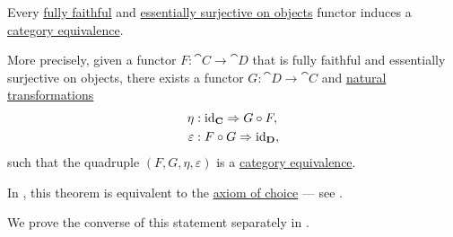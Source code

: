 \begin{theorem}\label{thm:fully_faithful_and_essentially_surjective_functor_induces_equivalence}
  Every \hyperref[def:functor_invertibility/fully_faithful]{fully faithful} and \hyperref[def:functor_invertibility/surjective_on_objects]{essentially surjective on objects} functor induces a \hyperref[def:category_equivalence]{category equivalence}.

  More precisely, given a functor \( F: \cat{C} \to \cat{D} \) that is fully faithful and essentially surjective on objects, there exists a functor \( G: \cat{D} \to \cat{C} \) and \hyperref[def:natural_transformation]{natural transformations}
  \begin{align*}
    \eta        &: \id_{\cat{C}} \Rightarrow G \bincirc F, \\
    \varepsilon &: F \bincirc G \Rightarrow \id_{\cat{D}},
  \end{align*}
  such that the quadruple \( (F, G, \eta, \varepsilon) \) is a \hyperref[def:category_equivalence]{category equivalence}.

  In \hyperref[def:zfc]{}, this theorem is equivalent to the \hyperref[def:zfc/choice]{axiom of choice} --- see .

  We prove the converse of this statement separately in .
\end{theorem}
